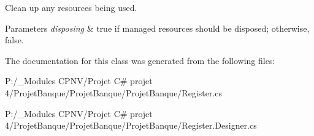 Clean up any resources being used. 


\begin{DoxyParams}{Parameters}
{\em disposing} & true if managed resources should be disposed; otherwise, false.\\
\hline
\end{DoxyParams}


The documentation for this class was generated from the following files\+:\begin{DoxyCompactItemize}
\item 
P\+:/\+\_\+\+Modules C\+P\+N\+V/\+Projet C\# projet 4/\+Projet\+Banque/\+Projet\+Banque/\+Projet\+Banque/Register.\+cs\item 
P\+:/\+\_\+\+Modules C\+P\+N\+V/\+Projet C\# projet 4/\+Projet\+Banque/\+Projet\+Banque/\+Projet\+Banque/Register.\+Designer.\+cs\end{DoxyCompactItemize}
